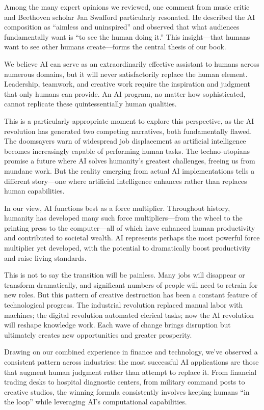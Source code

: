 \documentclass[
  Letterpaper,
]{scrbook}
\begin{document}
Among the many expert opinions we reviewed, one comment from music
critic and Beethoven scholar Jan Swafford particularly resonated. He
described the AI composition as ``aimless and uninspired'' and observed
that what audiences fundamentally want is ``to see the human doing it.''
This insight---that humans want to see other humans create---forms the
central thesis of our book.

We believe AI can serve as an extraordinarily effective assistant to
humans across numerous domains, but it will never satisfactorily replace
the human element. Leadership, teamwork, and creative work require the
inspiration and judgment that only humans can provide. An AI program, no
matter how sophisticated, cannot replicate these quintessentially human
qualities.

This is a particularly appropriate moment to explore this perspective,
as the AI revolution has generated two competing narratives, both
fundamentally flawed. The doomsayers warn of widespread job displacement
as artificial intelligence becomes increasingly capable of performing
human tasks. The techno-utopians promise a future where AI solves
humanity's greatest challenges, freeing us from mundane work. But the
reality emerging from actual AI implementations tells a different
story---one where artificial intelligence enhances rather than replaces
human capabilities.

In our view, AI functions best as a force multiplier. Throughout
history, humanity has developed many such force multipliers---from the
wheel to the printing press to the computer---all of which have enhanced
human productivity and contributed to societal wealth. AI represents
perhaps the most powerful force multiplier yet developed, with the
potential to dramatically boost productivity and raise living standards.

This is not to say the transition will be painless. Many jobs will
disappear or transform dramatically, and significant numbers of people
will need to retrain for new roles. But this pattern of creative
destruction has been a constant feature of technological progress. The
industrial revolution replaced manual labor with machines; the digital
revolution automated clerical tasks; now the AI revolution will reshape
knowledge work. Each wave of change brings disruption but ultimately
creates new opportunities and greater prosperity.

Drawing on our combined experience in finance and technology, we've
observed a consistent pattern across industries: the most successful AI
applications are those that augment human
judgment rather than attempt
to replace it. From financial trading desks to hospital diagnostic
centers, from military command posts to creative studios, the winning
formula consistently involves keeping humans ``in the loop'' while
leveraging AI's computational capabilities.
\end{document}
